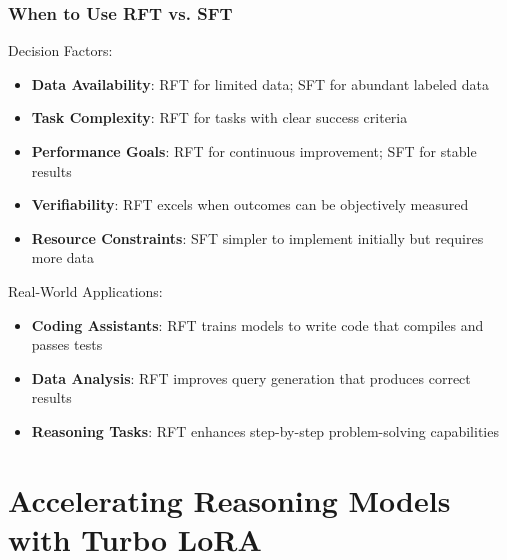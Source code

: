 \documentclass[aspectratio=169]{beamer}
\begin{document}
\begin{frame}
	\frametitle{When to Use RFT vs. SFT}
	\begin{block}{Decision Factors:}
		\begin{itemize}
			\item \textbf{Data Availability}: RFT for limited data; SFT for abundant labeled data
			\item \textbf{Task Complexity}: RFT for tasks with clear success criteria
			\item \textbf{Performance Goals}: RFT for continuous improvement; SFT for stable results
			\item \textbf{Verifiability}: RFT excels when outcomes can be objectively measured
			\item \textbf{Resource Constraints}: SFT simpler to implement initially but requires more data
		\end{itemize}
	\end{block}
	\begin{block}{Real-World Applications:}
		\begin{itemize}
			\item \textbf{Coding Assistants}: RFT trains models to write code that compiles and passes tests
			\item \textbf{Data Analysis}: RFT improves query generation that produces correct results
			\item \textbf{Reasoning Tasks}: RFT enhances step-by-step problem-solving capabilities
		\end{itemize}
	\end{block}
\end{frame}

\section{Accelerating Reasoning Models with Turbo LoRA}
\end{document}
